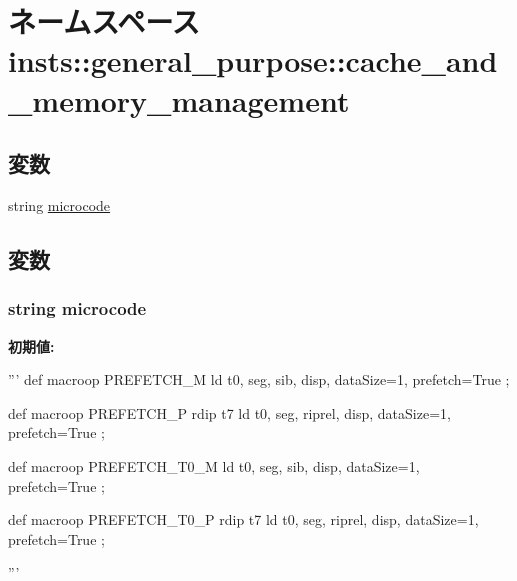 \hypertarget{namespaceinsts_1_1general__purpose_1_1cache__and__memory__management}{
\section{ネームスペース insts::general\_\-purpose::cache\_\-and\_\-memory\_\-management}
\label{namespaceinsts_1_1general__purpose_1_1cache__and__memory__management}
}
\subsection*{変数}
\begin{DoxyCompactItemize}
\item 
string \hyperlink{namespaceinsts_1_1general__purpose_1_1cache__and__memory__management_a770f11a173e99389a8802f0107ed8f52}{microcode}
\end{DoxyCompactItemize}


\subsection{変数}
\hypertarget{namespaceinsts_1_1general__purpose_1_1cache__and__memory__management_a770f11a173e99389a8802f0107ed8f52}{
\subsubsection[{microcode}]{\setlength{\rightskip}{0pt plus 5cm}string {\bf microcode}}}
\label{namespaceinsts_1_1general__purpose_1_1cache__and__memory__management_a770f11a173e99389a8802f0107ed8f52}
{\bfseries 初期値:}
\begin{DoxyCode}
'''
def macroop PREFETCH_M
{
    ld t0, seg, sib, disp, dataSize=1, prefetch=True
};

def macroop PREFETCH_P
{
    rdip t7
    ld t0, seg, riprel, disp, dataSize=1, prefetch=True
};

def macroop PREFETCH_T0_M
{
    ld t0, seg, sib, disp, dataSize=1, prefetch=True
};

def macroop PREFETCH_T0_P
{
    rdip t7
    ld t0, seg, riprel, disp, dataSize=1, prefetch=True
};

'''
\end{DoxyCode}
